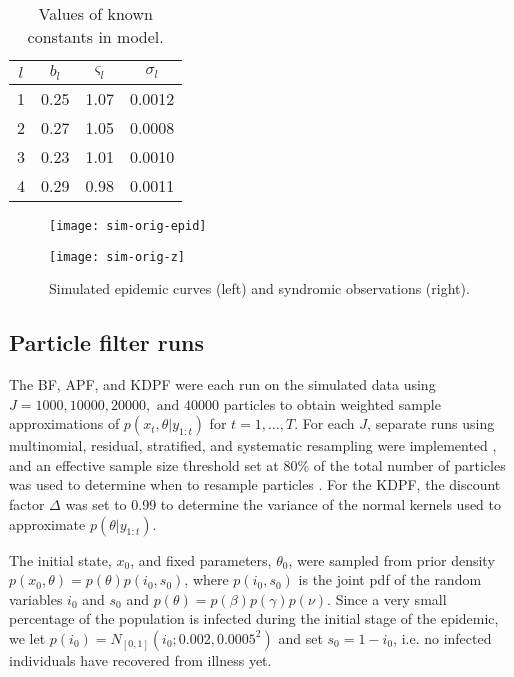 \documentclass{elsarticle}
\begin{document}
\begin{table}[hb]
\begin{center}
\begin{tabular}{|cccc|}
\hline
$l$ & $b_l$ & $\varsigma_l$ & $\sigma_l$ \\
\hline
1 & 0.25 & 1.07 & 0.0012 \\
2 & 0.27 & 1.05 & 0.0008 \\
3 & 0.23 & 1.01 & 0.0010 \\
4 & 0.29 & 0.98 & 0.0011 \\
\hline
\end{tabular}
\caption{Values of known constants in model.}
\label{tab:constants}
\end{center}
\end{table}

\begin{figure}
\centering
\begin{minipage}{0.48\linewidth}
\texttt{[image: sim-orig-epid]}
\end{minipage}
\begin{minipage}{0.48\linewidth}
\texttt{[image: sim-orig-z]}
\end{minipage}
\caption{Simulated epidemic curves (left) and syndromic observations (right).} \label{fig:data}
\end{figure}

\subsection{Particle filter runs} \label{sec:pf}

The BF, APF, and KDPF were each run on the simulated data using $J = 1000, 10000, 20000, \mbox{ and } 40000$ particles to obtain weighted sample approximations of $p(x_t,\theta|y_{1:t})$ for $t = 1,\ldots,T$. For each $J$, separate runs using multinomial, residual, stratified, and systematic resampling were implemented \citep{smcUtils}, and an effective sample size threshold set at 80\% of the total number of particles was used to determine when to resample particles \citep{Liu:Chen:Wong:reje:1998}. For the KDPF, the discount factor $\Delta$ was set to 0.99 to determine the variance of the normal kernels used to approximate $p(\theta|y_{1:t})$.

The initial state, $x_0$, and fixed parameters, $\theta_0$, were sampled from prior density $p(x_0,\theta) = p(\theta)p(i_0,s_0)$, where $p(i_0,s_0)$ is the joint pdf of the random variables $i_0$ and $s_0$ and $p(\theta) = p(\beta)p(\gamma)p(\nu)$. Since a very small percentage of the population is infected during the initial stage of the epidemic, we let $p(i_0) = N_{[0,1]}(i_0;0.002,0.0005^2)$ and set $s_0 = 1 - i_0$, i.e. no infected individuals have recovered from illness yet.
\end{document}
